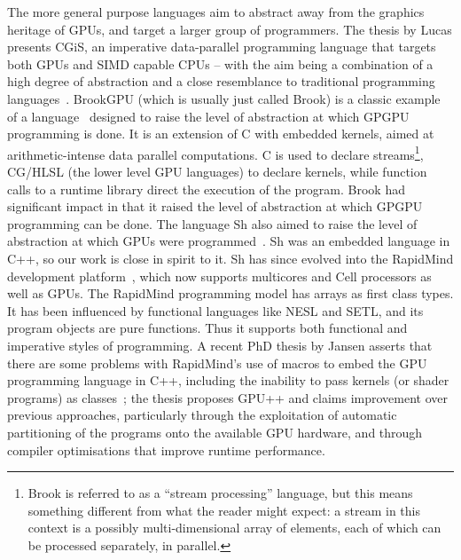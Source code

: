 The more general purpose languages aim to abstract away from the graphics heritage of GPUs, and target a larger group of programmers.
The thesis by Lucas presents CGiS, an imperative data-parallel programming
language that targets both GPUs and SIMD capable CPUs -- with the aim being
a combination of a high degree of abstraction and a close resemblance to traditional programming languages~.
BrookGPU (which is usually just called Brook) is a classic example of a language~ designed to raise the level of abstraction at which GPGPU programming is done. It is an extension of C with embedded kernels, aimed at arithmetic-intense data parallel computations. C is used to declare streams\footnote{Brook is referred to as a ``stream processing'' language, but this means something different from what the reader might expect: a stream in this context is
a possibly multi-dimensional array of elements, each of which can be processed separately, in parallel.}, CG/HLSL (the lower level GPU languages) to declare kernels, while
function calls to a runtime library direct the execution of the program.
Brook had significant impact in that it raised the level of abstraction at which GPGPU programming can be done. The language Sh also aimed to raise the level of abstraction at which GPUs were programmed~. Sh was an embedded language in C++, so our work is close in spirit to it. Sh has since evolved into the RapidMind development platform~, which now supports multicores and Cell processors as well as GPUs. 
The RapidMind programming model has arrays as first class types. It
has been influenced by functional languages like NESL and SETL, and its program objects are pure functions. Thus it supports both functional and imperative styles of programming.
A recent PhD thesis by Jansen asserts that there are some problems with RapidMind's use of macros to embed the GPU programming language in C++, including the inability to pass
kernels (or shader programs) as classes~; the thesis proposes GPU++ and claims improvement over previous approaches, particularly through the exploitation of automatic partitioning of the programs onto the available GPU hardware, and through compiler optimisations that improve runtime performance.

